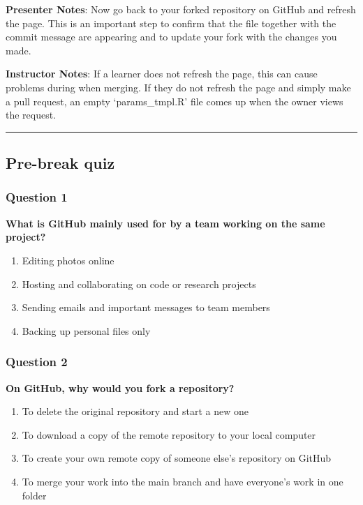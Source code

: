 \documentclass[
  letterpaper,
  DIV=11,
  numbers=noendperiod]{scrartcl}
\begin{document}
\textbf{Presenter Notes}: Now go back to your forked repository on
GitHub and refresh the page. This is an important step to confirm that
the file together with the commit message are appearing and to update
your fork with the changes you made.

\textbf{Instructor Notes}: If a learner does not refresh the page, this
can cause problems during when merging. If they do not refresh the page
and simply make a pull request, an empty `params\_tmpl.R' file comes up
when the owner views the request.

\begin{center}\rule{0.5\linewidth}{0.5pt}\end{center}

\subsection{Pre-break quiz}\label{pre-break-quiz}

\subsubsection{Question 1}

\textbf{What is GitHub mainly used for by a team working on the same
project?}

\begin{enumerate}
\def\labelenumi{\alph{enumi}.}
\item
  Editing photos online
\item
  Hosting and collaborating on code or research projects
\item
  Sending emails and important messages to team members
\item
  Backing up personal files only
\end{enumerate}

\subsubsection{Question 2}

\textbf{On GitHub, why would you fork a repository?}

\begin{enumerate}
\def\labelenumi{\alph{enumi}.}
\item
  To delete the original repository and start a new one
\item
  To download a copy of the remote repository to your local computer
\item
  To create your own remote copy of someone else's repository on GitHub
\item
  To merge your work into the main branch and have everyone's work in
  one folder
\end{enumerate}
\end{document}
